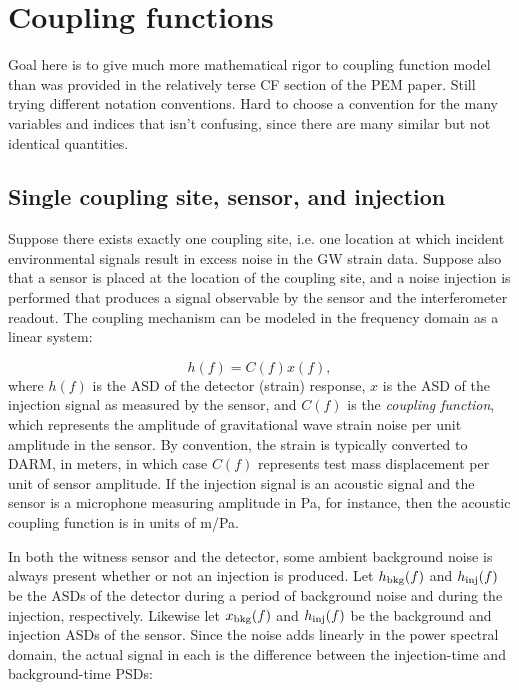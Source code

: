 \section{Coupling functions}\label{sec:cf}

{\color{red}
Goal here is to give much more mathematical rigor to coupling function model than was provided in the relatively terse CF section of the PEM paper.
Still trying different notation conventions.
Hard to choose a convention for the many variables and indices that isn't confusing, since there are many similar but not identical quantities.}

\subsection{Single coupling site, sensor, and injection}

Suppose there exists exactly one coupling site, i.e. one location at which incident environmental signals result in excess noise in the \ac{GW} strain data.
Suppose also that a sensor is placed at the location of the coupling site, and a noise injection is performed that produces a signal observable by the sensor and the interferometer readout.
The coupling mechanism can be modeled in the frequency domain as a linear system:

\begin{equation}\label{eq:cf_model}
	h(f) = C(f) x(f),
\end{equation}
where $h(f)$ is the \ac{ASD} of the detector (strain) response, $x$ is the \ac{ASD} of the injection signal as measured by the sensor, and $C(f)$ is the \textit{coupling function}, which represents the amplitude of gravitational wave strain noise per unit amplitude in the sensor.
By convention, the strain is typically converted to \ac{DARM}, in meters, in which case $C(f)$ represents  test mass displacement per unit of sensor amplitude.
If the injection signal is an acoustic signal and the sensor is a microphone measuring amplitude in Pa, for instance, then the acoustic coupling function is in units of m/Pa.

In both the witness sensor and the detector, some ambient background noise is always present whether or not an injection is produced. Let $h_{\textrm{bkg}}(f)$ and $h_{\textrm{inj}}(f)$ be the \acp{ASD} of the detector during a period of background noise and during the injection, respectively. Likewise let $x_{\textrm{bkg}}(f)$ and $h_{\textrm{inj}}(f)$ be the background and injection \acp{ASD} of the sensor. Since the noise adds linearly in the power spectral domain, the actual signal in each is the difference between the injection-time and background-time \acp{PSD}:


